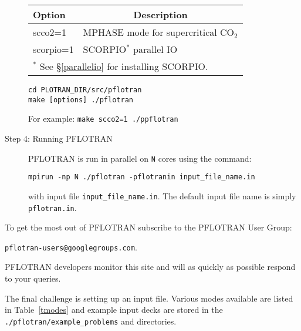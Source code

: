 \begin{description}
\begin{table}[H]
\vspace{3mm}

\label{topt}
\begin{tabular}{ll}
\toprule
Option & \multicolumn{1}{c}{Description}\\
\midrule
scco2=1 & MPHASE mode for supercritical CO$_2$\\
scorpio=1 & SCORPIO$^{*}$ parallel IO\\
\bottomrule
\multicolumn{2}{l}{$^{*}$ See \S\ref{parallelio} for installing SCORPIO.}
\end{tabular}

\end{table}

\footnotesize
\begin{Verbatim}
cd PLOTRAN_DIR/src/pflotran
make [options] ./pflotran
\end{Verbatim}
\normalsize

For example: {\footnotesize\tt make scco2=1 ./ppflotran}

\item[Step 4: Running PFLOTRAN] PFLOTRAN is run in parallel on {\tt N} cores using the command:

{\footnotesize\tt mpirun -np N ./pflotran -pflotranin input\_file\_name.in}

with input file {\footnotesize\tt input\_file\_name.in}. The default input file name is simply {\footnotesize\tt pflotran.in}.
\end{description}

\noindent
To get the most out of PFLOTRAN subscribe to the PFLOTRAN User Group:

{\footnotesize\tt pflotran-users@googlegroups.com}.

\noindent
PFLOTRAN developers monitor this site and will as quickly as possible respond to your queries.

The final challenge is setting up an input file. Various modes available are listed in Table~\ref{tmodes} and example input decks are stored in the {\footnotesize\tt ./pflotran/example\_problems} and  directories.

